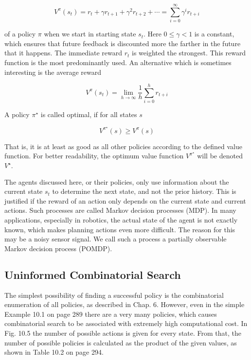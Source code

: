 \documentclass[10pt]{book}
\begin{document}
\begin{equation*}
V^{\pi}\left(s_{t}\right)=r_{t}+\gamma r_{t+1}+\gamma^{2} r_{t+2}+\cdots=\sum_{i=0}^{\infty} \gamma^{i} r_{t+i} \tag{10.1}
\end{equation*}

of a policy $\pi$ when we start in starting state $s_{t}$. Here $0 \leq \gamma<1$ is a constant, which ensures that future feedback is discounted more the farther in the future that it happens. The immediate reward $r_{t}$ is weighted the strongest. This reward function is the most predominantly used. An alternative which is sometimes interesting is the average reward

\begin{equation*}
V^{\pi}\left(s_{t}\right)=\lim _{h \rightarrow \infty} \frac{1}{h} \sum_{i=0}^{h} r_{t+i} \tag{10.2}
\end{equation*}

A policy $\pi^{\star}$ is called optimal, if for all states $s$

\begin{equation*}
V^{\pi^{\star}}(s) \geq V^{\pi}(s) \tag{10.3}
\end{equation*}

That is, it is at least as good as all other policies according to the defined value function. For better readability, the optimum value function $V^{\pi^{\star}}$ will be denoted $V^{\star}$.

The agents discussed here, or their policies, only use information about the current state $s_{t}$ to determine the next state, and not the prior history. This is justified if the reward of an action only depends on the current state and current actions. Such processes are called Markov decision processes (MDP). In many applications, especially in robotics, the actual state of the agent is not exactly known, which makes planning actions even more difficult. The reason for this may be a noisy sensor signal. We call such a process a partially observable Markov decision process (POMDP).

\subsection{Uninformed Combinatorial Search}
The simplest possibility of finding a successful policy is the combinatorial enumeration of all policies, as described in Chap. 6. However, even in the simple Example 10.1 on page 289 there are a very many policies, which causes combinatorial search to be associated with extremely high computational cost. In Fig. 10.5 the number of possible actions is given for every state. From that, the number of possible policies is calculated as the product of the given values, as shown in Table 10.2 on page 294.
\end{document}
